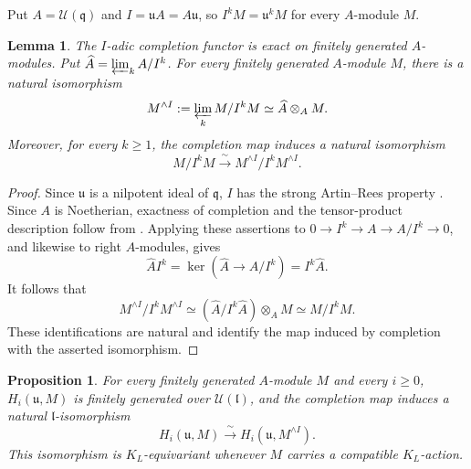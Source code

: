 \documentclass[a4paper,12pt]{amsart}
\numberwithin{equation}{section}
\theoremstyle{plain}
\newtheorem{proposition}[theorem]{Proposition}
\newtheorem{lemma}[theorem]{Lemma}
\theoremstyle{definition}
\theoremstyle{remark}
\begin{document}
Put $A=\mathcal U(\mathfrak q)$ and $I=\mathfrak uA=A\mathfrak u$, so $I^kM=\mathfrak u^kM$ for every $A$-module $M$.

\begin{lemma}\label{L:adic-completion}
The $I$-adic completion functor is exact on finitely generated $A$-modules.
Put $\widehat A=\varprojlim_k A/I^k$.
For every finitely generated $A$-module $M$, there is a natural isomorphism
\[
 M^{\wedge I}:=\varprojlim_k M/I^kM\simeq\widehat A\otimes_A M.
\]
Moreover, for every $k\geq1$, the completion map induces a natural isomorphism
\[
 M/I^kM\xrightarrow{\ \sim\ }M^{\wedge I}/I^kM^{\wedge I}.
\]
\end{lemma}

\begin{proof}
Since $\mathfrak u$ is a nilpotent ideal of $\mathfrak q$, $I$ has the strong Artin--Rees property \cite[Theorem~2.1]{SW82}.
Since $A$ is Noetherian, exactness of completion and the tensor-product description follow from \cite[Chapter~I, Proposition~5.10(1),(3)]{NVO79}.
Applying these assertions to $0\to I^k\to A\to A/I^k\to0$, and likewise to right $A$-modules, gives
\[
 \widehat A I^k=\ker(\widehat A\to A/I^k)=I^k\widehat A.
\]
It follows that
\[
 M^{\wedge I}/I^kM^{\wedge I}\simeq (\widehat A/I^k\widehat A)\otimes_A M\simeq M/I^kM .
\]
These identifications are natural and identify the map induced by completion with the asserted isomorphism.
\end{proof}

\begin{proposition}\label{P:completion-homology}
For every finitely generated $A$-module $M$ and every $i\geq0$, $H_i(\mathfrak u,M)$ is finitely generated over $\mathcal U(\mathfrak l)$, and the completion map induces a natural $\mathfrak l$-isomorphism
\[
 H_i(\mathfrak u,M)\xrightarrow{\ \sim\ } H_i(\mathfrak u,M^{\wedge I}).
\]
This isomorphism is $K_L$-equivariant whenever $M$ carries a compatible $K_L$-action.
\end{proposition}
\end{document}
